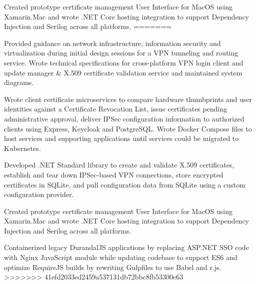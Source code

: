 \begin{cventries}
{\begin{cvitems}
        \item {Created prototype certificate management User Interface for MacOS using Xamarin.Mac and wrote .NET Core hosting integration to support Dependency Injection and Serilog across all platforms.}
=======
        \item {Provided guidance on network infrastructure, information security and virtualization during initial design sessions for a VPN tunneling and routing service. Wrote technical specifications for cross-platform VPN login client and update manager \& X.509 certificate validation service and maintained system diagrams.}
        \item {Wrote client certificate microservices to compare hardware thumbprints and user identities against a Certificate Revocation List, issue certificates pending administrative approval, deliver IPSec configuration information to authorized clients using Express, Keycloak and PostgreSQL. Wrote Docker Compose files to host services and supporting applications until services could be migrated to Kubernetes.}
        \item {Developed .NET Standard library to create and validate X.509 certificates, establish and tear down IPSec-based VPN connections, store encrypted certificates in SQLite, and pull configuration data from SQLite using a custom configuration provider.}
        \item {Created prototype certificate management User Interface for MacOS using Xamarin.Mac and wrote .NET Core hosting integration to support Dependency Injection and Serilog across all platforms.}
        \item {Containerized legacy DurandalJS applications by replacing ASP.NET SSO code with Nginx JavaScript module while updating codebase to support ES6 and optimize RequireJS builds by rewriting Gulpfiles to use Babel and r.js.}
>>>>>>> 41efd2033ed2459a537131db72bbc8fb53300e63
      \end{cvitems}
    }


\end{cventries}
